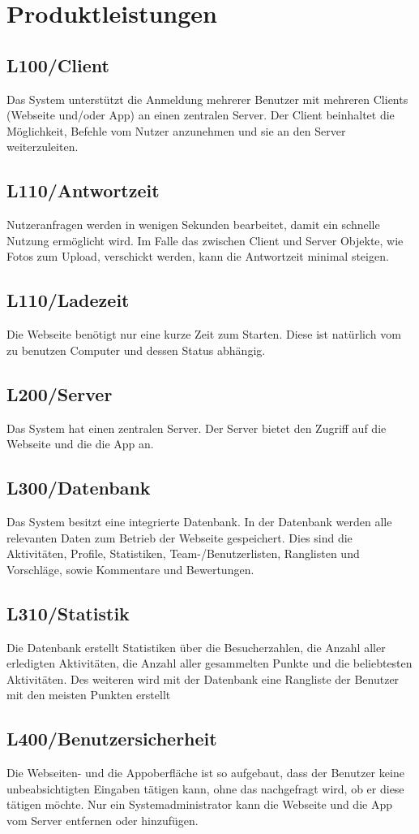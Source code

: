 ﻿\section{Produktleistungen}


\subsection{L100/Client} 
Das System unterstützt die Anmeldung mehrerer Benutzer mit mehreren Clients (Webseite und/oder App) an einen zentralen Server. Der Client beinhaltet die Möglichkeit, Befehle vom Nutzer anzunehmen und sie an den Server weiterzuleiten. 

\subsection{L110/Antwortzeit} 
Nutzeranfragen werden in wenigen Sekunden bearbeitet, damit ein schnelle Nutzung ermöglicht wird. Im Falle das zwischen Client und Server Objekte, wie Fotos zum Upload, verschickt werden, kann die Antwortzeit minimal steigen. 

\subsection{L110/Ladezeit} 
Die Webseite benötigt nur eine kurze Zeit zum Starten. Diese ist natürlich vom zu benutzen Computer und dessen Status abhängig. 

\subsection{L200/Server} 
Das System hat einen zentralen Server. Der Server bietet den Zugriff auf die Webseite und die die App an. 

\subsection{L300/Datenbank} 
Das System besitzt eine integrierte Datenbank. In der Datenbank werden alle relevanten Daten zum Betrieb der Webseite gespeichert. Dies sind die Aktivitäten, Profile, Statistiken, Team-/Benutzerlisten, Ranglisten und Vorschläge, sowie Kommentare und Bewertungen.

\subsection{L310/Statistik} 
Die Datenbank erstellt Statistiken über die Besucherzahlen, die Anzahl aller erledigten Aktivitäten, die Anzahl aller gesammelten Punkte und die beliebtesten Aktivitäten. Des weiteren wird mit der Datenbank eine Rangliste der Benutzer mit den meisten Punkten erstellt 


\subsection{L400/Benutzersicherheit} 
Die Webseiten- und die Appoberfläche ist so aufgebaut, dass der Benutzer keine unbeabsichtigten Eingaben tätigen kann, ohne das nachgefragt wird, ob er diese tätigen möchte. Nur ein Systemadministrator kann die Webseite und die App vom Server entfernen oder hinzufügen.
